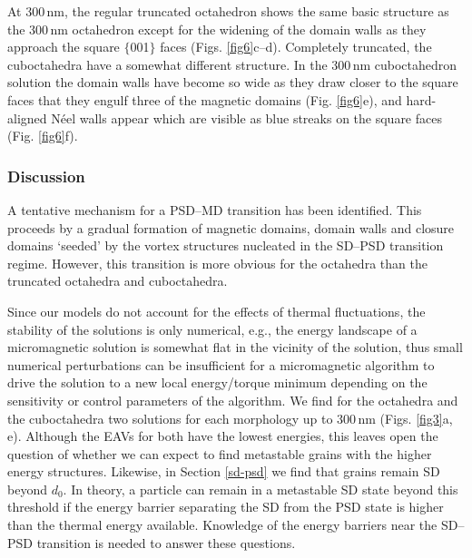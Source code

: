 \documentclass[review,authoryear]{elsarticle}
\newcommand{\nm}{\,\text{nm}}
\begin{document}
At 300$\nm$, the regular truncated octahedron shows the same basic structure as the 300$\nm$ octahedron except for the widening of the domain walls as they approach the square $\{$001$\}$ faces (Figs. \ref{fig6}c--d). Completely truncated, the cuboctahedra have a somewhat different structure. In the 300$\nm$ cuboctahedron solution the domain walls have become so wide as they draw closer to the square faces that they engulf three of the magnetic domains (Fig. \ref{fig6}e), and hard-aligned N\'eel walls appear which are visible as blue streaks on the square faces (Fig. \ref{fig6}f).\par

\subsubsection{Discussion}
A tentative mechanism for a PSD--MD transition has been identified. This proceeds by a gradual formation of magnetic domains, domain walls and closure domains `seeded' by the vortex structures nucleated in the SD--PSD transition regime. However, this transition is more obvious for the octahedra than the truncated octahedra and cuboctahedra.\par

Since our models do not account for the effects of thermal fluctuations, the stability of the solutions is only numerical, e.g., the energy landscape of a micromagnetic solution is somewhat flat in the vicinity of the solution, thus small numerical perturbations can be insufficient for a micromagnetic algorithm to drive the solution to a new local energy/torque minimum depending on the sensitivity or control parameters of the algorithm. We find for the octahedra and the cuboctahedra two solutions for each morphology up to 300$\nm$ (Figs. \ref{fig3}a, e). Although the EAVs for both have the lowest energies, this leaves open the question of whether we can expect to find metastable grains with the higher energy structures. Likewise, in Section \ref{sd-psd} we find that grains remain SD beyond $d_0$. In theory, a particle can remain in a metastable SD state beyond this threshold if the energy barrier separating the SD from the PSD state is higher than the thermal energy available. Knowledge of the energy barriers near the SD--PSD transition is needed to answer these questions.\par
\end{document}
